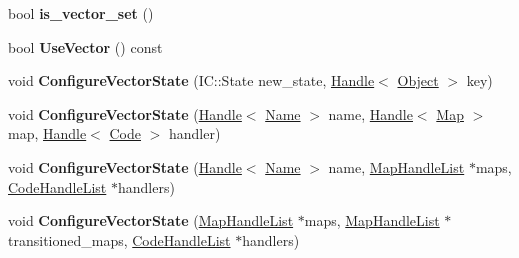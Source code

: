 \begin{DoxyCompactItemize}
\item 
bool {\bfseries is\+\_\+vector\+\_\+set} ()\hypertarget{classv8_1_1internal_1_1_i_c_a39bce448a405f3137d7fb8a8c3d2cda1}{}\label{classv8_1_1internal_1_1_i_c_a39bce448a405f3137d7fb8a8c3d2cda1}

\item 
bool {\bfseries Use\+Vector} () const \hypertarget{classv8_1_1internal_1_1_i_c_a10cb0b35d8d1874377291b62cbe861f4}{}\label{classv8_1_1internal_1_1_i_c_a10cb0b35d8d1874377291b62cbe861f4}

\item 
void {\bfseries Configure\+Vector\+State} (I\+C\+::\+State new\+\_\+state, \hyperlink{classv8_1_1internal_1_1_handle}{Handle}$<$ \hyperlink{classv8_1_1internal_1_1_object}{Object} $>$ key)\hypertarget{classv8_1_1internal_1_1_i_c_af4a5928957a198872a13a8fc42e54504}{}\label{classv8_1_1internal_1_1_i_c_af4a5928957a198872a13a8fc42e54504}

\item 
void {\bfseries Configure\+Vector\+State} (\hyperlink{classv8_1_1internal_1_1_handle}{Handle}$<$ \hyperlink{classv8_1_1internal_1_1_name}{Name} $>$ name, \hyperlink{classv8_1_1internal_1_1_handle}{Handle}$<$ \hyperlink{classv8_1_1internal_1_1_map}{Map} $>$ map, \hyperlink{classv8_1_1internal_1_1_handle}{Handle}$<$ \hyperlink{classv8_1_1internal_1_1_code}{Code} $>$ handler)\hypertarget{classv8_1_1internal_1_1_i_c_a208cf0eb7ed9f1c839d8979389209531}{}\label{classv8_1_1internal_1_1_i_c_a208cf0eb7ed9f1c839d8979389209531}

\item 
void {\bfseries Configure\+Vector\+State} (\hyperlink{classv8_1_1internal_1_1_handle}{Handle}$<$ \hyperlink{classv8_1_1internal_1_1_name}{Name} $>$ name, \hyperlink{classv8_1_1internal_1_1_list}{Map\+Handle\+List} $\ast$maps, \hyperlink{classv8_1_1internal_1_1_list}{Code\+Handle\+List} $\ast$handlers)\hypertarget{classv8_1_1internal_1_1_i_c_a03dd0e29400f0ed52da3a544eb8b4e63}{}\label{classv8_1_1internal_1_1_i_c_a03dd0e29400f0ed52da3a544eb8b4e63}

\item 
void {\bfseries Configure\+Vector\+State} (\hyperlink{classv8_1_1internal_1_1_list}{Map\+Handle\+List} $\ast$maps, \hyperlink{classv8_1_1internal_1_1_list}{Map\+Handle\+List} $\ast$transitioned\+\_\+maps, \hyperlink{classv8_1_1internal_1_1_list}{Code\+Handle\+List} $\ast$handlers)\hypertarget{classv8_1_1internal_1_1_i_c_a82a3773da7fc9f332c9ca0b332f4e57e}{}\label{classv8_1_1internal_1_1_i_c_a82a3773da7fc9f332c9ca0b332f4e57e}


\end{DoxyCompactItemize}
